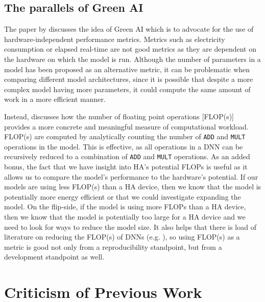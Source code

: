 \documentclass[logo,bsc,singlespacing,parskip,online]{infthesis}
\begin{document}

\subsection{The parallels of Green AI}
The paper by \citet{schwartz2019greenai} discusses the idea of Green AI 
which is to advocate for the use of hardware-independent performance metrics.
Metrics such as electricity consumption or elapsed real-time are not good metrics 
as they are dependent on the hardware on which the model is run. 
Although the number of parameters in a model has been proposed as an 
alternative metric, it can be problematic when comparing different model architectures, 
since it is possible that despite a more complex model having more parameters, 
it could compute the same amount of work in a more efficient manner. 

Instead, \citet{schwartz2019greenai} discusses how the number of floating point operations [FLOP(s)]
provides a more concrete and meaningful measure of computational workload. 
FLOP(s) are computed by analytically counting the number of \texttt{ADD} and \texttt{MULT} operations in the model.
This is effective, as all operations in a DNN can be recursively reduced to a combination 
of \texttt{ADD} and \texttt{MULT} operations.
As an added bonus, the fact that we have insight into HA's potential FLOPs is useful 
as it allows us to compare the model's performance to the hardware's potential. If our
models are using less FLOP(s) than a HA device, then we know that the model is
potentially more energy efficient or that we could investigate expanding
the model. On the flip-side, if the model is using more FLOPs than a HA device, 
then we know that the model is potentially too large for a HA device and we need
to look for ways to reduce the model size. It also helps that there is load
of literature on reducing the FLOP(s) of DNNs (e.g. \cite{liu_simple_2023}), so
using FLOP(s) as a metric is good not only from a reproducibility standpoint, 
but from a development standpoint as well. 

\section{Criticism of Previous Work}
\label{sec:criticism}
\end{document}
